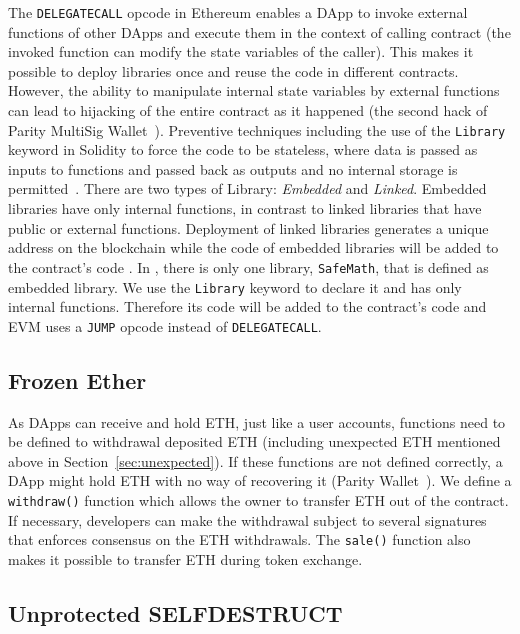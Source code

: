 The \texttt{DELEGATECALL} opcode in Ethereum enables a DApp to invoke external functions of other DApps and execute them in the context of calling contract (\ie the invoked function can modify the state variables of the caller). This makes it possible to deploy libraries once and reuse the code in different contracts. However, the ability to manipulate internal state variables by external functions can lead to hijacking of the entire contract as it happened (\cf the second hack of Parity MultiSig Wallet~\cite{ParitySecondHack}). Preventive techniques including the use of the \texttt{Library} keyword in Solidity to force the code to be stateless, where data is passed as inputs to functions and passed back as outputs and no internal storage is permitted~\cite{LIB1}. There are two types of Library: \textit{Embedded} and \textit{Linked}. Embedded libraries have only internal functions, in contrast to linked libraries that have public or external functions. Deployment of linked libraries generates a unique address on the blockchain while the code of embedded libraries will be added to the contract's code \cite{LIB2}. In \sys, there is only one library, \texttt{SafeMath}, that is defined as embedded library. We use the \texttt{Library} keyword to declare it and has only internal functions. Therefore its code will be added to the \erc contract's code and EVM uses a \texttt{JUMP} opcode instead of \texttt{DELEGATECALL}.

\subsection{Frozen Ether}

As DApps can receive and hold ETH, just like a user accounts, functions need to be defined to withdrawal deposited ETH (including unexpected ETH mentioned above in Section~\ref{sec:unexpected}). If these functions are not defined correctly, a DApp might hold ETH with no way of recovering it (\cf Parity Wallet~\cite{ParityWalletHack}). We define a \texttt{withdraw()} function which allows the owner to transfer ETH out of the contract. {\chg If necessary, developers can make the withdrawal subject to several signatures that enforces consensus on the ETH withdrawals.} The \texttt{sale()} function also makes it possible to transfer ETH during token exchange.

\subsection{Unprotected SELFDESTRUCT}

